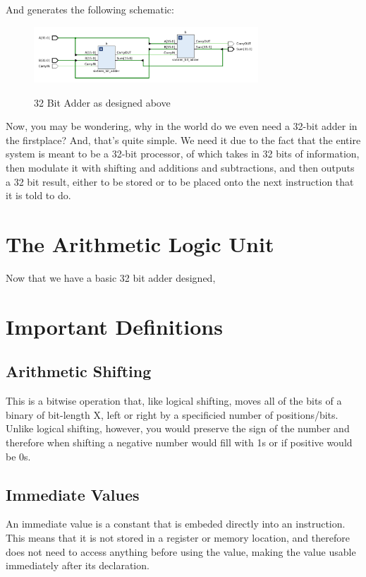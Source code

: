 \documentclass{article}
\begin{document}
And generates the following schematic:
\begin{figure}[!htbp]
    \centering
    \caption{32 Bit Adder as designed above}
    \includegraphics[width=0.75\textwidth]{pictures/part1/thirtytwo_bit_adder.png}
    \label{32 Bit Adder}
\end{figure}\newline
Now, you may be wondering, why in the world do we even need a 32-bit adder in the firstplace? And, that's quite simple. We need it due to the fact that the entire system is meant to be a 32-bit processor, of which takes in 32 bits of information, then modulate it with shifting and additions and subtractions, and then outputs a 32 bit result, either to be stored or to be placed onto the next instruction that it is told to do.



\newpage
\section{The Arithmetic Logic Unit}
\qquad Now that we have a basic 32 bit adder designed, 



\newpage
\section{Important Definitions}

\subsection{Arithmetic Shifting}
\qquad
This is a bitwise operation that, like logical shifting, moves all of the bits of a binary of bit-length X, left or right by a specificied number of positions/bits. Unlike logical shifting, however, you would preserve the sign of the number and therefore when shifting a negative number would fill with 1s or if positive would be 0s.

\subsection{Immediate Values}
\qquad
An immediate value is a constant that is embeded directly into an instruction. This means that it is not stored in a register or memory location, and therefore does not need to access anything before using the value, making the value usable immediately after its declaration.
\end{document}
